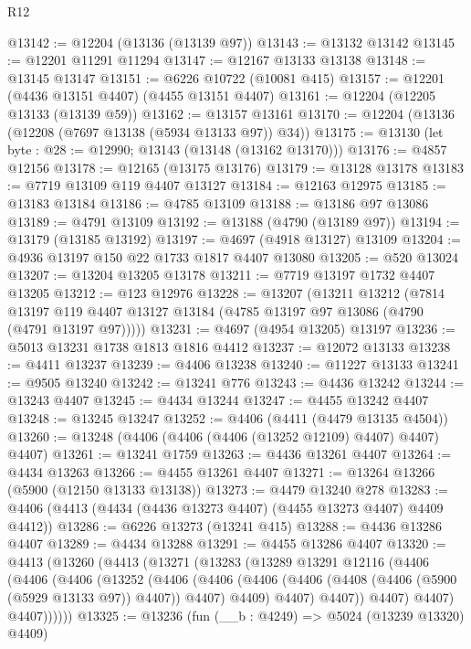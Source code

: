 \begin{lexlean}{R12}
\begin{coremodule}
@13142 := @12204 (@13136 (@13139 @97))
@13143 := @13132 @13142
@13145 := @12201 @11291 @11294
@13147 := @12167 @13133 @13138
@13148 := @13145 @13147
@13151 := @6226 @10722 (@10081 @415)
@13157 := @12201 (@4436 @13151 @4407) (@4455 @13151 @4407)
@13161 := @12204 (@12205 @13133 (@13139 @59))
@13162 := @13157 @13161
@13170 := @12204 (@13136 (@12208 (@7697 @13138 (@5934 @13133 @97)) @34))
@13175 := @13130 (let byte : @28 := @12990; @13143 (@13148 (@13162 @13170)))
@13176 := @4857 @12156
@13178 := @12165 (@13175 @13176)
@13179 := @13128 @13178
@13183 := @7719 @13109 @119 @4407 @13127
@13184 := @12163 @12975
@13185 := @13183 @13184
@13186 := @4785 @13109
@13188 := @13186 @97 @13086
@13189 := @4791 @13109
@13192 := @13188 (@4790 (@13189 @97))
@13194 := @13179 (@13185 @13192)
@13197 := @4697 (@4918 @13127) @13109
@13204 := @4936 @13197 @150 @22 @1733 @1817 @4407 @13080
@13205 := @520 @13024
@13207 := @13204 @13205 @13178
@13211 := @7719 @13197 @1732 @4407 @13205
@13212 := @123 @12976
@13228 := @13207
    (@13211
      @13212
      (@7814 @13197 @119 @4407 @13127 @13184 (@4785 @13197 @97 @13086 (@4790 (@4791 @13197 @97)))))
@13231 := @4697 (@4954 @13205) @13197
@13236 := @5013 @13231 @1738 @1813 @1816 @4412
@13237 := @12072 @13133
@13238 := @4411 @13237
@13239 := @4406 @13238
@13240 := @11227 @13133
@13241 := @9505 @13240
@13242 := @13241 @776
@13243 := @4436 @13242
@13244 := @13243 @4407
@13245 := @4434 @13244
@13247 := @4455 @13242 @4407
@13248 := @13245 @13247
@13252 := @4406 (@4411 (@4479 @13135 @4504))
@13260 := @13248 (@4406 (@4406 (@4406 (@13252 @12109) @4407) @4407) @4407)
@13261 := @13241 @1759
@13263 := @4436 @13261 @4407
@13264 := @4434 @13263
@13266 := @4455 @13261 @4407
@13271 := @13264 @13266 (@5900 (@12150 @13133 @13138))
@13273 := @4479 @13240 @278
@13283 := @4406 (@4413 (@4434 (@4436 @13273 @4407) (@4455 @13273 @4407) @4409 @4412))
@13286 := @6226 @13273 (@13241 @415)
@13288 := @4436 @13286 @4407
@13289 := @4434 @13288
@13291 := @4455 @13286 @4407
@13320 := @4413
    (@13260
      (@4413
        (@13271
          (@13283
            (@13289
              @13291
              @12116
              (@4406
                (@4406
                  (@4406
                    (@13252
                      (@4406
                        (@4406
                          (@4406
                            (@4406 (@4408 (@4406 (@5900 (@5929 @13133 @97)) @4407)) @4407)
                            @4409)
                          @4407)
                        @4407))
                    @4407)
                  @4407)
                @4407))))))
@13325 := @13236 (fun (__b : @4249) => @5024 (@13239 @13320) @4409)

\end{coremodule}
\end{lexlean}
